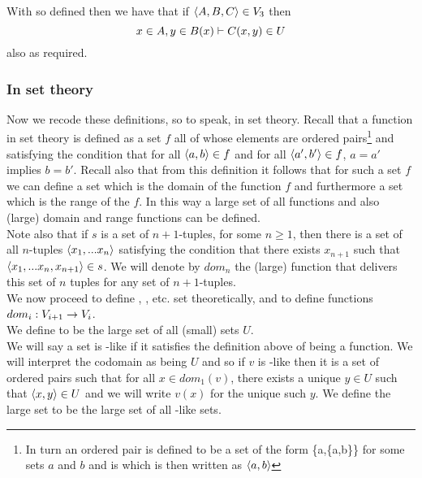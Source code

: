 \documentclass[10pt,a4paper]{scrartcl}
\begin{document}
\noindent
With \varset[3] so defined then we have that if $\tuple{A,B,C} \in \varset[3]$ then
\begin{equation*}
x \in A, y \in B(x) \tstyle C(x,y) \in U 
\end{equation*}
also as required.

\subsubsection{In set theory}
Now we recode these definitions, so to speak, in set theory.
Recall that a function in set theory is defined as a set $f$ all of whose elements are ordered pairs\footnote{In turn an ordered pair is defined to be a set of the form \{a,\{a,b\}\} for some sets $a$ and $b$ and is which is then written as $\tuple{a,b}$} 
and satisfying the condition that for all 
 $\tuple{a,b} \in f$ and for all $\tuple{a',b'} \in f$, $a=a'$ implies $b=b'$. Recall also that from this definition it follows that for such a set $f$ we can define a set which is the domain of the function $f$ and furthermore a set which is the range of the $f$. In this way
a large set of all functions and also (large) domain and range functions can be defined. \\ 

\noindent Note also that if $s$ is a set of $n+1$-tuples, for some $n \geq 1$, then there 
is a set of
all $n$-tuples $\tuple{x_1,...x_n}$ satisfying the condition that there exists $x_{n+1}$ 
such that $\tuple{x_1,...x_n,x_{n+1}} \in s$. 
We will denote by $dom_n$ the (large) function that delivers this 
	set of $n$ tuples for any set of $n+1$-tuples. \\
	
\noindent
We now proceed to  define \varset[2], \varset[3], etc. set theoretically, and to define functions 
$dom_i: \varset[i+1] \morph \varset[i]$. \\

\noindent
We define \varset[1] to be the large set of all (small) sets $U$. \\

\noindent
We will say a set is \varset[2]-like if it satisfies the definition above of being a function. We will interpret the codomain as being $U$ and so if $v$ is \varset[2]-like then it is a set of ordered pairs such that for all $x \in dom_1(v)$, there exists a unique $y \in U$ such that
$\tuple{x,y} \in U$ and we will write $v(x)$ for the unique such $y$. We define the large set \varset[2] to be the large set of all \varset[2]-like  sets.\\
\end{document}
